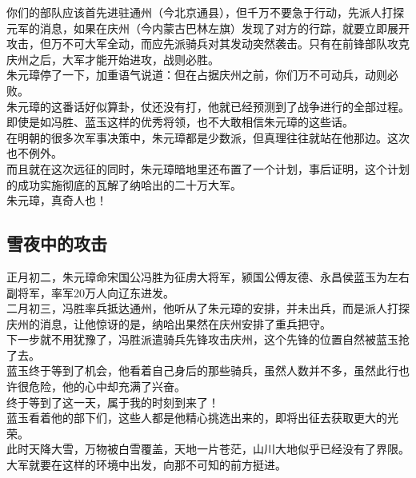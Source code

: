 \begin{multicols}{\theparacolNo}
你们的部队应该首先进驻通州（今北京通县），但千万不要急于行动，先派人打探元军的消息，如果在庆州（今内蒙古巴林左旗）发现了对方的行踪，就要立即展开攻击，但万不可大军全动，而应先派骑兵对其发动突然袭击。只有在前锋部队攻克庆州之后，大军才能开始进攻，战则必胜。\\

朱元璋停了一下，加重语气说道：但在占据庆州之前，你们万不可动兵，动则必败。\\

朱元璋的这番话好似算卦，仗还没有打，他就已经预测到了战争进行的全部过程。即使是如冯胜、蓝玉这样的优秀将领，也不大敢相信朱元璋的这些话。\\

在明朝的很多次军事决策中，朱元璋都是少数派，但真理往往就站在他那边。这次也不例外。\\

而且就在这次远征的同时，朱元璋暗地里还布置了一个计划，事后证明，这个计划的成功实施彻底的瓦解了纳哈出的二十万大军。\\

朱元璋，真奇人也！\\

\subsection{雪夜中的攻击}
正月初二，朱元璋命宋国公冯胜为征虏大将军，颍国公傅友德、永昌侯蓝玉为左右副将军，率军20万人向辽东进发。\\

二月初三，冯胜率兵抵达通州，他听从了朱元璋的安排，并未出兵，而是派人打探庆州的消息，让他惊讶的是，纳哈出果然在庆州安排了重兵把守。\\

下一步就不用犹豫了，冯胜派遣骑兵先锋攻击庆州，这个先锋的位置自然被蓝玉抢了去。\\

蓝玉终于等到了机会，他看着自己身后的那些骑兵，虽然人数并不多，虽然此行也许很危险，他的心中却充满了兴奋。\\

终于等到了这一天，属于我的时刻到来了！\\

蓝玉看着他的部下们，这些人都是他精心挑选出来的，即将出征去获取更大的光荣。\\

此时天降大雪，万物被白雪覆盖，天地一片苍茫，山川大地似乎已经没有了界限。大军就要在这样的环境中出发，向那不可知的前方挺进。\\


\end{multicols}
